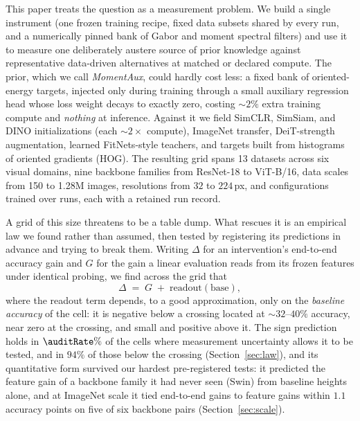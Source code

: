 This paper treats the question as a measurement problem. We build a single
instrument (one frozen training recipe, fixed data subsets shared by every
run, and a numerically pinned bank of Gabor and moment spectral filters) and
use it to measure one deliberately austere source of prior knowledge against
representative data-driven alternatives at matched or declared compute. The prior, which we call \emph{MomentAux}, could hardly cost
less: a fixed bank of oriented-energy targets, injected only during training
through a small auxiliary regression head whose loss weight decays to exactly
zero, costing ${\sim}2\%$ extra training compute and \emph{nothing} at
inference. Against it we field SimCLR, SimSiam, and DINO initializations
(each ${\sim}2\times$ compute), ImageNet transfer, DeiT-strength
augmentation, learned FitNets-style teachers, and targets built from histograms of oriented gradients (HOG). The
resulting grid spans 13 datasets across six visual domains, nine backbone
families from ResNet-18 to ViT-B/16, data scales from 150 to 1.28M images,
resolutions from $32$ to $224$\,px, and \computeCells{} configurations trained
over \computeRuns{} runs, each with a retained run record.

A grid of this size threatens to be a table dump. What rescues it is an
empirical law we found rather than assumed, then tested by registering its
predictions in advance and trying to break them. Writing $\Delta$ for an intervention's end-to-end
accuracy gain and $G$ for the gain a linear evaluation reads from its frozen
features under identical probing, we find across the grid that
\begin{equation}
  \Delta \;=\; G \;+\; \mathrm{readout}(\mathrm{base}),
  \label{eq:law}
\end{equation}
where the readout term depends, to a good approximation, only on the
\emph{baseline accuracy} of the cell: it is negative below a crossing
located at ${\sim}32$--$40\%$ accuracy, near zero at the crossing, and
small and positive above it. The sign prediction holds in $\auditRate\%$ of the
\auditResolvable{} cells where measurement uncertainty allows it to be tested, and
in $94\%$ of those below the crossing
(Section~\ref{sec:law}), and its quantitative form survived our hardest
pre-registered tests: it predicted the feature gain of a backbone family it
had never seen (Swin) from baseline heights alone, and at ImageNet scale it
tied end-to-end gains to feature gains within $1.1$ accuracy points on five
of six backbone pairs (Section~\ref{sec:scale}).

